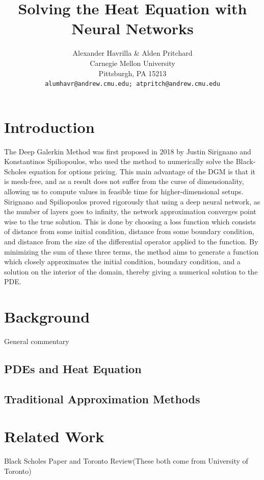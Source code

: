 \documentclass{article}
\title{Solving the Heat Equation with Neural Networks}
\author{
  Alexander Havrilla \& Alden Pritchard\\
  Carnegie Mellon University\\
  Pittsburgh, PA 15213 \\
  \texttt{alumhavr@andrew.cmu.edu; atpritch@andrew.cmu.edu} \\
}
\begin{document}

\maketitle

\section{Introduction}
The Deep Galerkin Method was first proposed in 2018 by Justin Sirignano and Konstantinos Spiliopoulos, who used the method to numerically solve the Black-Scholes equation for options pricing. This main advantage of the DGM is that it is mesh-free, and as a result does not suffer from the curse of dimensionality, allowing us to compute values in feasible time for higher-dimensional setups. Sirignano and Spiliopoulos proved rigorously that using a deep neural network, as the number of layers goes to infinity, the network approximation converges point wise to the true solution. This is done by choosing a loss function which consists of distance from some initial condition, distance from some boundary condition, and distance from the size of the differential operator applied to the function. By minimizing the sum of these three terms, the method aims to generate a function which closely approximates the initial condition, boundary condition, and a solution on the interior of the domain, thereby giving a numerical solution to the PDE.

\section{Background}

General commentary

\subsection{PDEs and Heat Equation}

\subsection{Traditional Approximation Methods}

\section{Related Work}

Black Scholes Paper and Toronto Review(These both come from University of Toronto)
\end{document}
